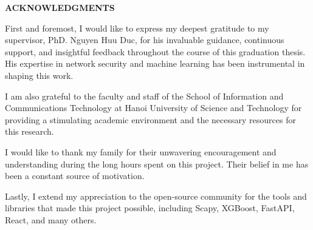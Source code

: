 \documentclass[../Main.tex]{subfiles}
\begin{document}
\begin{center}
    \Large{\textbf{ACKNOWLEDGMENTS}}\\
\end{center}
\vspace{1cm}

First and foremost, I would like to express my deepest gratitude to my supervisor, PhD. Nguyen Huu Duc, for his invaluable guidance, continuous support, and insightful feedback throughout the course of this graduation thesis. His expertise in network security and machine learning has been instrumental in shaping this work.

I am also grateful to the faculty and staff of the School of Information and Communications Technology at Hanoi University of Science and Technology for providing a stimulating academic environment and the necessary resources for this research.

I would like to thank my family for their unwavering encouragement and understanding during the long hours spent on this project. Their belief in me has been a constant source of motivation.

Lastly, I extend my appreciation to the open-source community for the tools and libraries that made this project possible, including Scapy, XGBoost, FastAPI, React, and many others.
\end{document}
